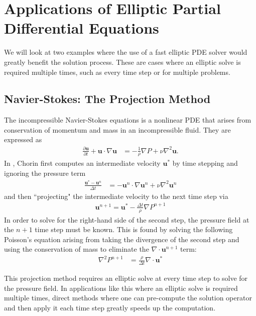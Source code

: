 \section{Applications of Elliptic Partial Differential Equations}
\label{sec:applications}

We will look at two examples where the use of a fast elliptic PDE solver would greatly benefit the solution process. These are cases where an elliptic solve is required multiple times, such as every time step or for multiple problems.

\subsection{Navier-Stokes: The Projection Method}

The incompressible Navier-Stokes equations is a nonlinear PDE that arises from conservation of momentum and mass in an incompressible fluid. They are expressed as
\begin{align}
    \frac{\partial \textbf{u}}{\partial t} + \textbf{u} \cdot \nabla \textbf{u} &= -\frac{1}{\rho} \nabla P + \nu \nabla^2 \textbf{u}.
\end{align}
In \cite{chorin1967numerical}, Chorin first computes an intermediate velocity $\textbf{u}^*$ by time stepping and ignoring the pressure term
\begin{align}
    \frac{\textbf{u}^* - \textbf{u}^n}{\Delta t} &= -\textbf{u}^n \cdot \nabla \textbf{u}^n + \nu \nabla^2 \textbf{u}^n
\end{align}
and then ``projecting" the intermediate velocity to the next time step via
\begin{align}
    \textbf{u}^{n+1} = \textbf{u}^* - \frac{\Delta t}{\rho} \nabla P^{n+1}
\end{align}
In order to solve for the right-hand side of the second step, the pressure field at the $n+1$ time step must be known. This is found by solving the following Poisson's equation arising from taking the divergence of the second step and using the conservation of mass to eliminate the $\nabla \cdot \textbf{u}^{n+1}$ term:
\begin{align}
    \nabla^2 P^{n+1} &= \frac{\rho}{\Delta t} \nabla \cdot \textbf{u}^*
\end{align}

This projection method requires an elliptic solve at every time step to solve for the pressure field. In applications like this where an elliptic solve is required multiple times, direct methods where one can pre-compute the solution operator and then apply it each time step greatly speeds up the computation.

